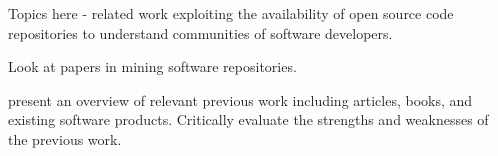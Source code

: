 Topics here - related work exploiting the availability of open source code repositories to understand communities of software 
developers.

Look at papers in mining software repositories.

present an overview of relevant previous work including articles, books, and existing software products. Critically evaluate the strengths and weaknesses of the previous work.




